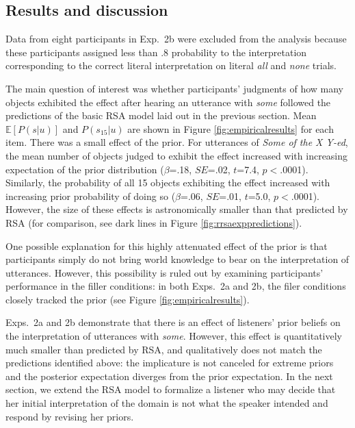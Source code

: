\documentclass[10pt,letterpaper]{article}
\newcommand{\figref}[1]{Figure \ref{#1}}
\begin{document}
 
 \subsection{Results and discussion}

Data from eight participants in Exp.~2b were excluded from the analysis because these participants assigned less than .8 probability to the interpretation corresponding to the correct literal interpretation on literal \emph{all} and \emph{none} trials. 

The main question of interest was whether participants' judgments of how many objects exhibited the effect after hearing an utterance with \emph{some} followed the predictions of the basic RSA model laid out in the previous section. Mean $\mathbb{E}[P(s|u)]$ and $P(s_{15}|u)$ are shown in \figref{fig:empiricalresults} for each item. There was a small effect of the prior. For utterances of \emph{Some of the X Y-ed}, the mean number of objects judged to exhibit the effect increased with increasing expectation of the prior distribution ($\beta$=.18, $SE$=.02, $t$=7.4, $p$$<$.0001). Similarly, the probability of all 15 objects exhibiting the effect increased with increasing prior probability of doing so ($\beta$=.06, $SE$=.01, $t$=5.0, $p$$<$.0001). However, the size of these effects is astronomically smaller than that predicted by RSA (for comparison, see dark lines in \figref{fig:rrsaexppredictions}).%

One possible explanation for this highly attenuated effect of the prior is that participants simply do not bring world knowledge to bear on the interpretation of utterances. However, this possibility is ruled out by examining participants' performance in the filler conditions: in both Exps.~2a and 2b, the filer conditions closely tracked the prior (see \figref{fig:empiricalresults}). 

Exps.~2a and 2b demonstrate that there is an effect of listeners' prior beliefs on the interpretation of utterances with \emph{some}. However, this effect is quantitatively much smaller than predicted by RSA, and qualitatively does not match the predictions identified above: the implicature is not canceled for extreme priors and the posterior expectation diverges from the prior expectation.
In the next section, we extend the RSA model to formalize a listener who may decide that her initial interpretation of the domain is not what the speaker intended and respond by revising her priors.
\end{document}
